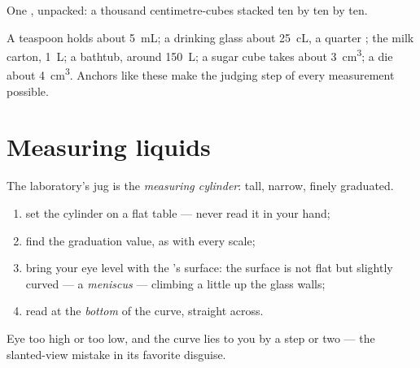 \begin{omfigure}

{\small One , unpacked: a thousand centimetre-cubes stacked
ten by ten by ten.}
\end{omfigure}

\begin{example}\label{ex:g6:mass-and-volume:byheart}
A teaspoon holds about \qty{5}{mL}; a drinking glass about
\qty{25}{cL}, a quarter ; the milk carton, \qty{1}{L}; a
bathtub, around \qty{150}{L}; a sugar cube takes about
\qty{3}{cm^3}; a die about \qty{4}{cm^3}. Anchors like these make
the judging step of every measurement possible.
\end{example}

\section{Measuring liquids}

\begin{method}\label{met:g6:mass-and-volume:cylinder}
The laboratory's jug is the \emph{measuring cylinder}: tall,
narrow, finely graduated.
\begin{enumerate}
  \item set the cylinder on a flat table --- never read it in your
        hand;
  \item find the graduation value, as with every scale;
  \item bring your eye level with the 's surface: the
        surface is not flat but slightly curved --- a
        \emph{meniscus} --- climbing a little up
        the glass walls;
  \item read at the \emph{bottom} of the curve, straight across.
\end{enumerate}
Eye too high or too low, and the curve lies to you by a step or
two --- the slanted-view mistake in its favorite disguise.
\end{method}

